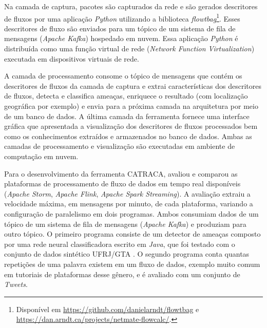 

Na camada de captura, pacotes são capturados da rede e 
são gerados descritores de fluxos
por uma aplicação \emph{Python} utilizando a biblioteca \emph{flowtbag}\footnote{
    Disponível em \url{https://github.com/danielarndt/flowtbag} e
    \url{https://dan.arndt.ca/projects/netmate-flowcalc/}.
}.
Esses descritores de fluxo são enviados para um tópico de um sistema de fila de mensagens
(\emph{Apache Kafka}) hospedado em nuvem.
Essa aplicação \emph{Python} é distribuída como uma função virtual de rede
(\emph{Network Function Virtualization}) executada em dispositivos virtuais de rede.

A camada de processamento consome o tópico de mensagens que contém os descritores de fluxos
da camada de captura e extrai características dos descritores de fluxos, detecta e classifica ameaças,
enriquece o resultado (com localização geográfica por exemplo) e envia para a
próxima camada na arquitetura por meio de um banco de dados.
A última camada da ferramenta fornece uma interface gráfica que apresentada a
visualização dos descritores de fluxos processados bem como os conhecimentos extraídos e
armazenados no banco de dados.
Ambas as camadas de processamento e visualização são executadas em ambiente de
computação em nuvem.

Para o desenvolvimento da ferramenta CATRACA,  avaliou e
comparou as plataformas de processamento de fluxo de dados em tempo real
disponíveis (\emph{Apache Storm}, \emph{Apache Flink}, \emph{Apache Spark Streaming}).
A avaliação extraiu a velocidade máxima, em mensagens por minuto,
de cada plataforma, variando a configuração de paralelismo
em dois programas.
Ambos consumiam dados de um tópico de um sistema de fila
de mensagens (\emph{Apache Kafka}) e produziam para outro tópico.
O primeiro programa consiste de um detector de ameaças composto por
uma rede neural classificadora escrito em \emph{Java}, que foi testado
com o conjunto de dados sintético UFRJ/GTA \cite{Lopez2018}.
O segundo programa conta quantas repetições de uma palavra existem em um
fluxo de dados, exemplo muito comum em tutoriais de plataformas desse gênero,
e é avaliado com um conjunto de \emph{Tweets}.

